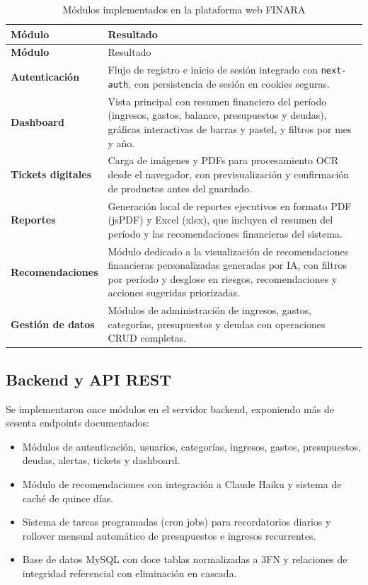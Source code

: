 \begin{longtable}{>{\bfseries\small}p{4cm} p{9.5cm}}
  \caption{Módulos implementados en la plataforma web FINARA}
  \label{tab:modulos-web} \\
  \toprule
  Módulo & Resultado \\
  \midrule
  \endfirsthead
  \toprule
  Módulo & Resultado \\
  \midrule
  \endhead
  Autenticación & Flujo de registro e inicio de sesión integrado con
    \texttt{next-auth}, con persistencia de sesión en cookies seguras. \\[4pt]
  Dashboard & Vista principal con resumen financiero del período
    (ingresos, gastos, balance, presupuestos y deudas), gráficas
    interactivas de barras y pastel, y filtros por mes y año. \\[4pt]
  Tickets digitales & Carga de imágenes y PDFs para procesamiento OCR
    desde el navegador, con previsualización y confirmación de
    productos antes del guardado. \\[4pt]
  Reportes & Generación local de reportes ejecutivos en formato PDF
    (jsPDF) y Excel (xlsx), que incluyen el resumen del período y las
    recomendaciones financieras del sistema. \\[4pt]
  Recomendaciones & Módulo dedicado a la visualización de
    recomendaciones financieras personalizadas generadas por IA,
    con filtros por período y desglose en riesgos, recomendaciones
    y acciones sugeridas priorizadas. \\[4pt]
  Gestión de datos & Módulos de administración de ingresos, gastos,
    categorías, presupuestos y deudas con operaciones CRUD completas. \\
  \bottomrule
\end{longtable}

\subsection{Backend y API REST}

Se implementaron once módulos en el servidor backend, exponiendo más
de sesenta endpoints documentados:

\begin{itemize}
  \item Módulos de autenticación, usuarios, categorías, ingresos,
    gastos, presupuestos, deudas, alertas, tickets y dashboard.
  \item Módulo de recomendaciones con integración a Claude Haiku y
    sistema de caché de quince días.
  \item Sistema de tareas programadas (cron jobs) para recordatorios
    diarios y rollover mensual automático de presupuestos e ingresos
    recurrentes.
  \item Base de datos MySQL con doce tablas normalizadas a 3FN y
    relaciones de integridad referencial con eliminación en cascada.
\end{itemize}


